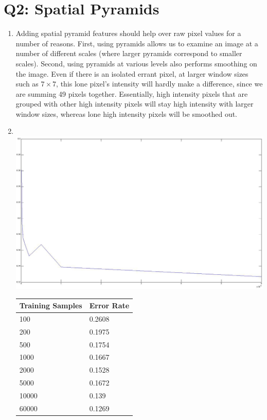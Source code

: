 \documentclass[12pt]{article}
\begin{document}
\section*{Q2: Spatial Pyramids}
  \begin{enumerate}[a]
    \item Adding spatial pyramid features should help over raw pixel values for
      a number of reasons. First, using pyramids allows us to examine an image
      at a number of different scales (where larger pyramids correspond to
      smaller scales). Second, using pyramids at various levels also performs
      smoothing on the image. Even if there is an isolated errant pixel, at
      larger window sizes such as $7 \times 7$, this lone pixel's intensity will
      hardly make a difference, since we are summing 49 pixels
      together. Essentially, high intensity pixels that are grouped with other
      high intensity pixels will stay high intensity with larger window sizes,
      whereas lone high intensity pixels will be smoothed out.
    \item \quad \\
      \includegraphics[scale=0.35]{q2_full.jpg}
      \begin{tabular}{l|l}
        \hline
        Training Samples & Error Rate \\
        \hline
        100   & 0.2608 \\
        200   & 0.1975 \\
        500   & 0.1754 \\
        1000  & 0.1667 \\
        2000  & 0.1528 \\
        5000  & 0.1672 \\
        10000 & 0.139 \\
        60000 & 0.1269 \\
      \end{tabular}
  \end{enumerate}
\end{document}
